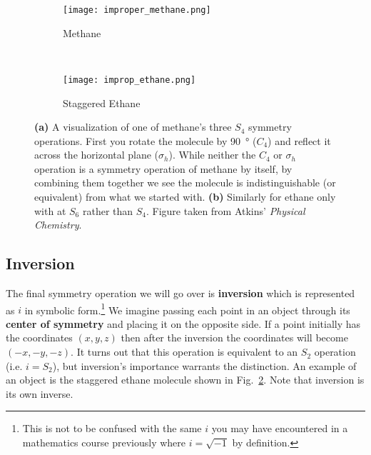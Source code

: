         \begin{figure}[ht]
            \begin{center} 
            \begin{subfigure}[b]{0.35\textwidth}
                \texttt{[image: improper\_methane.png]}
                \caption{Methane}
                \label{fig:improp_methane}         
            \end{subfigure}
            ~
            \begin{subfigure}[b]{0.33\textwidth}
                \texttt{[image: improp\_ethane.png]}
                \caption{Staggered Ethane}
                \label{fig:improp_ethane}         
            \end{subfigure}
            \caption{\textbf{(a)} A visualization of one of methane's three $S_4$ symmetry operations. First you rotate the molecule by \SI{90}{\degree} ($C_4$) and reflect it across the horizontal plane ($\sigma_h$). While neither the $C_4$ or $\sigma_h$ operation is a symmetry operation of methane by itself, by combining them together we see the molecule is indistinguishable (or equivalent) from what we started with. \textbf{(b)} Similarly for ethane only with at $S_6$ rather than $S_4$. Figure taken from Atkins' \emph{Physical Chemistry}.\cite{atkins2014physical}}
            \label{fig:improper}
            \end{center}
        \end{figure}
        


        \subsection*{Inversion} %
        \label{sub:inversion}
        The final symmetry operation we will go over is \textbf{inversion} which is represented as $i$ in symbolic form.\footnote{This is not to be confused with the same $i$ you may have encountered in a mathematics course previously where $i = \sqrt{-1}$ by definition.} We imagine passing each point in an object through its \textbf{center of symmetry} and placing it on the opposite side. If a point initially has the coordinates $(x,y,z)$ then after the inversion the coordinates will become $(-x,-y,-z).$ It turns out that this operation is equivalent to an $S_2$ operation (i.e. $i = S_2$), but inversion's importance warrants the distinction. An example of an object is the staggered ethane molecule shown in Fig.~\ref{fig:improp_ethane}. Note that inversion is its own inverse.

